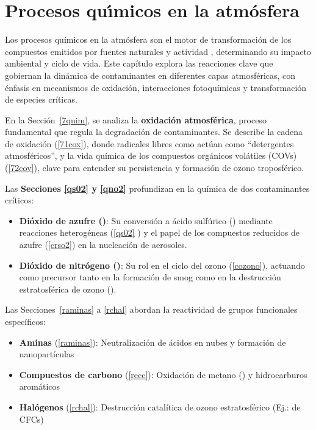 %
\chapter[\textrm{Química en la atmósfera}]{Procesos qu\'{\i}micos en la atm\'osfera}

Los procesos químicos en la atmósfera son el motor de transformación de los compuestos emitidos por fuentes naturales y actividad , determinando su impacto ambiental y ciclo de vida. Este capítulo explora las reacciones clave que gobiernan la dinámica de contaminantes en diferentes capas atmosféricas, con énfasis en mecanismos de oxidación, interacciones fotoquímicas y transformación de especies críticas.

En la Sección~\ref{7quim}, se analiza la \textbf{oxidación atmosférica}, proceso fundamental que regula la degradación de contaminantes. Se describe la cadena de oxidación (\ref{71cox}), donde radicales libres como  actúan como ``detergentes atmosféricos'', y la vida química de los compuestos orgánicos volátiles (COVs) (\ref{72cov}), clave para entender su persistencia y formación de ozono troposférico.

Las \textbf{Secciones \ref{qs02} y \ref{qno2}} profundizan en la química de dos contaminantes críticos:
\begin{itemize}
    \item \textbf{Dióxido de azufre ()}: Su conversión a ácido sulfúrico () mediante reacciones heterogéneas (\ref{qs02} ) y el papel de los compuestos reducidos de azufre (\ref{crso2}) en la nucleación de aerosoles.
    \item \textbf{Dióxido de nitrógeno ()}: Su rol en el ciclo del ozono (\ref{cozono}), actuando como precursor tanto en la formación de smog como en la destrucción estratosférica de ozono ().
\end{itemize}

Las Secciones~\ref{raminas} a  \ref{rchal} abordan la reactividad de grupos funcionales específicos:
\begin{itemize}
    \item \textbf{Aminas} (\ref{raminas}): Neutralización de ácidos en nubes y formación de nanopartículas
    \item \textbf{Compuestos de carbono} (\ref{recc}): Oxidación de metano () y hidrocarburos aromáticos
    \item \textbf{Halógenos} (\ref{rchal}): Destrucción catalítica de ozono estratosférico (Ej.:  de CFCs)
\end{itemize}

